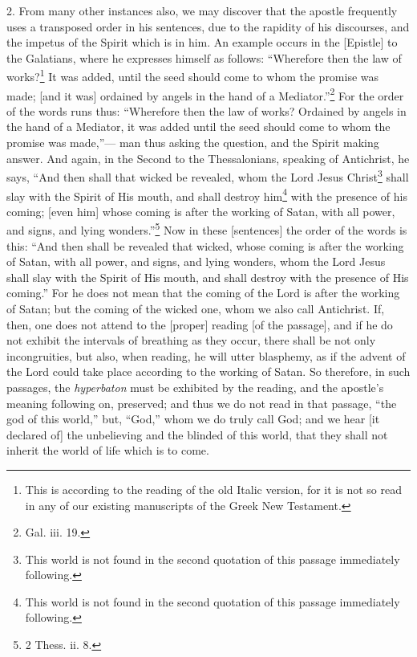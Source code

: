 2. From many other instances also, we may discover that the apostle frequently uses a transposed order in his sentences, due to the rapidity of his discourses, and the impetus of the Spirit which is in him. An example occurs in the [Epistle] to the Galatians, where he expresses himself as follows: “Wherefore then the law of works?\footnote{This is according to the reading of the old Italic version, for it is not so read in any of our existing manuscripts of the Greek New Testament.} It was added, until the seed should come to whom the promise was made; [and it was] ordained by angels in the hand of a Mediator.”\footnote{Gal. iii. 19.} For the order of the words runs thus: “Wherefore then the law of works? Ordained by angels in the hand of a Mediator, it was added until the seed should come to whom the promise was made,”— man thus asking the question, and the Spirit making answer. And again, in the Second to the Thessalonians, speaking of Antichrist, he says, “And then shall that wicked be revealed, whom the Lord Jesus Christ\footnote{This world is not found in the second quotation of this passage immediately following.} shall slay with the Spirit of His mouth, and shall destroy him\footnote{This world is not found in the second quotation of this passage immediately following.} with the presence of his coming; [even him] whose coming is after the working of Satan, with all power, and signs, and lying wonders.”\footnote{2 Thess. ii. 8.} Now in these [sentences] the order of the words is this: “And then shall be revealed that wicked, whose coming is after the working of Satan, with all power, and signs, and lying wonders, whom  the Lord Jesus shall slay with the Spirit of His mouth, and shall destroy with the presence of His coming.” For he does not mean that the coming of the Lord is after the working of Satan; but the coming of the wicked one, whom we also call Antichrist. If, then, one does not attend to the [proper] reading [of the passage], and if he do not exhibit the intervals of breathing as they occur, there shall be not only incongruities, but also, when reading, he will utter blasphemy, as if the advent of the Lord could take place according to the working of Satan. So therefore, in such passages, the \emph{hyperbaton} must be exhibited by the reading, and the apostle’s meaning following on, preserved; and thus we do not read in that passage, “the god of this world,” but, “God,” whom we do truly call God; and we hear [it declared of] the unbelieving and the blinded of this world, that they shall not inherit the world of life which is to come.

